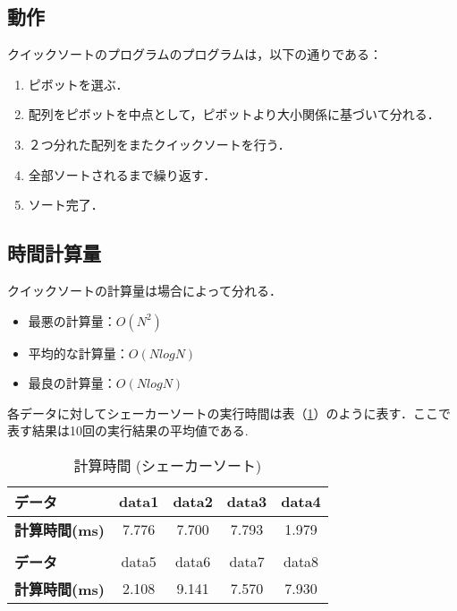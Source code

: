 \documentclass[a4j, titlepage]{jarticle}
\begin{document}
        \subsection{動作}
            クイックソートのプログラムのプログラムは，以下の通りである：
            \begin{screen}
                \begin{enumerate}
                    \item ピボットを選ぶ．
                    \item 配列をピボットを中点として，ピボットより大小関係に基づいて分れる．
                    \item ２つ分れた配列をまたクイックソートを行う．
                    \item 全部ソートされるまで繰り返す．
                    \item ソート完了．
                \end{enumerate}
            \end{screen}
        
        \subsection{時間計算量}
            クイックソートの計算量は場合によって分れる．
            \begin{itemize}
                \item 最悪の計算量：$O(N^2)$
                \item 平均的な計算量：$O(NlogN)$
                \item 最良の計算量：$O(NlogN)$
            \end{itemize}

            各データに対してシェーカーソートの実行時間は表（\ref{tab:quick}）のように表す．ここで表す結果は10回の実行結果の平均値である.

            \begin{table}[tbh]
                \caption{計算時間 (シェーカーソート)}
                \label{tab:quick}
                \begin{center}
                    \begin{tabular}{lcccc}
                        \hline
                        \textbf{データ} & data1 & data2 &data3 &data4 \\ \hline
                        \textbf{計算時間(ms)} & 7.776 & 7.700 & 7.793 & 1.979 \\ \hline
                        \\ \hline
                        \textbf{データ} & data5 &data6 &data7 &data8\\ \hline
                        \textbf{計算時間(ms)} & 2.108 & 9.141 & 7.570 & 7.930 \\ \hline
                    \end{tabular}
                \end{center}
            \end{table}
\end{document}
